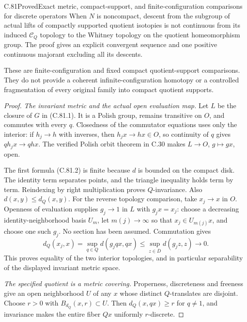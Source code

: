 \begin{claim}{C.81}{Proved}{Exact metric, compact-support, and finite-configuration comparisons for discrete operators}
When $N$ is noncompact, descent from the subgroup
of actual lifts of compactly supported quotient
isotopies is not continuous from its induced
$\mathscr C_Q$ topology to the Whitney topology
on the quotient homeomorphism group. The proof
gives an explicit convergent sequence and one
positive continuous majorant excluding all its
descents.

These are finite-configuration and fixed compact
quotient-support comparisons. They do not provide
a coherent infinite-configuration homotopy or
a controlled fragmentation of every original
family into compact quotient supports.
\end{claim}

\begin{proof}
\emph{The invariant metric and the actual open evaluation map.}
Let $L$ be the closure of $G$ in (C.81.1).
It is a Polish group, remains transitive on $O$,
and commutes with every $q$. Closedness of the
commutator equations uses only the interior:
if $h_j\to h$ with inverses, then $h_jx\to hx\in O$,
so continuity of $q$ gives $qh_jx\to qhx$.
The verified Polish orbit theorem in C.30 makes
$L\to O$, $g\mapsto gx$, open.

The first formula (C.81.2) is finite because
$d$ is bounded on the compact disk. The identity
term separates points, and the triangle inequality
holds term by term. Reindexing by right
multiplication proves $Q$-invariance. Also
$d(x,y)\leq d_Q(x,y)$.
For the reverse topology comparison, take
$x_j\to x$ in $O$. Openness of evaluation
supplies $g_j\to1$ in $L$ with $g_jx=x_j$:
choose a decreasing identity-neighborhood basis
$U_m$, let $m(j)\to\infty$ so that
$x_j\in U_{m(j)}x$, and choose one such $g_j$.
No section has been assumed. Commutation gives
\[
 d_Q(x_j,x)=\sup_{q\in Q}d(g_jqx,qx)
       \leq\sup_{z\in\overline D}d(g_jz,z)
       \longrightarrow0.
                                                               \tag{C.81.4}
\]
This proves equality of the two interior
topologies, and in particular separability
of the displayed invariant metric space.

\emph{The specified quotient is a metric covering.}
Properness, discreteness and freeness give an
open neighborhood $U$ of any $x$ whose distinct
$Q$-translates are disjoint. Choose $r>0$ with
$B_{d_Q}(x,r)\subset U$. Then
$d_Q(x,qx)\geq r$ for $q\ne1$, and invariance
makes the entire fiber $Qx$ uniformly $r$-discrete.


\end{proof}
